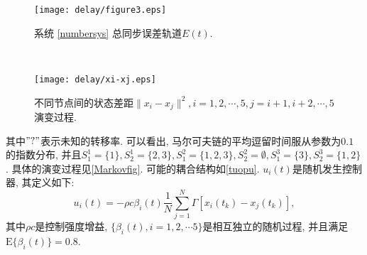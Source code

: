 \begin{figure}[!htb]
\begin{minipage}[t]{0.48\linewidth}
\centering
\texttt{[image: delay/figure3.eps]}
\caption{系统 \eqref{numbersys} 总同步误差轨道$E(t)$.}
\label{totallerror}
\end{minipage}~~
\begin{minipage}[t]{0.48\linewidth}
\centering
\texttt{[image: delay/xi-xj.eps]}
\caption{不同节点间的状态差距$\|x_i-x_j\|^2, i=1,2,\cdots,5,j=i+1,i+2,\cdots,5$演变过程.}\label{xixj}
\end{minipage}
\end{figure}
    其中$"?"$表示未知的转移率. 可以看出, 马尔可夫链的平均逗留时间服从参数为$0.1$ 的指数分布, 并且$S_1^1=\{1\},S_2^1=\{2,3\},S_1^2=\{1,2,3\},S_2^2=\emptyset,S_1^3=\{3\},S_2^3=\{1,2\}$. 具体的演变过程见\autoref{Markovfig}.
    可能的耦合结构如\autoref{tuopu}.
$u_i(t)$是随机发生控制器, 其定义如下:
$$u_i(t)=-\rho c\beta_{i}(t)\frac{1}{N}\sum_{j=1}^N\Gamma[x_{i}(t_{k})-x_j(t_{k})],$$
其中$\rho c$是控制强度增益, $\{\beta_{i}(t), i=1,2,\cdots 5\}$是相互独立的随机过程, 并且满足$\mathrm{E}\{\beta_{i}(t)\}=0.8$.

